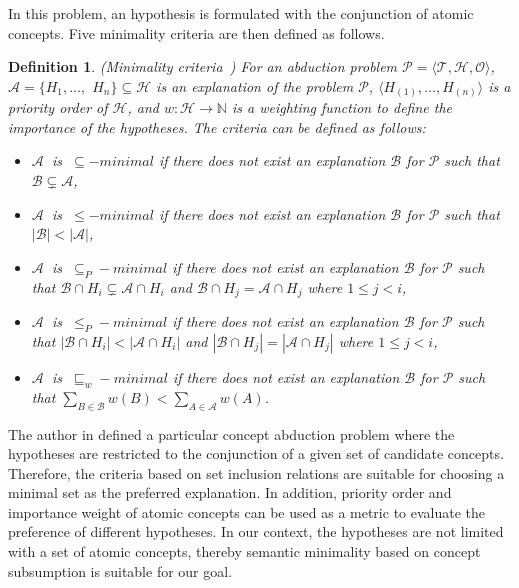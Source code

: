 \documentclass{article}
\newtheorem{mydef}{Definition}
\newcommand\abs[1]{\left\lvert #1 \right\rvert}
\begin{document}
In this problem, an hypothesis is formulated with the conjunction of atomic concepts.
Five minimality criteria are then defined as follows.
\begin{mydef}{(Minimality criteria~\cite{bienvenu08complexity})}
For an abduction problem $\mathcal{P}=\langle \mathcal{T},\mathcal{H}, \mathcal{O}\rangle$, $\mathcal{A}=\{H_1,\dots,$ $H_n \} \subseteq \mathcal{H}$ is an explanation of the problem $\mathcal{P}$,
$\langle H_{(1)},\dots,H_{(n)}\rangle$ is a priority order of  $\mathcal{H}$,
and $w:\mathcal{H}\rightarrow \mathbb{N}$ is a weighting function to define the importance of the hypotheses. The criteria can be defined as follows:
\begin{itemize}
\item  $\mathcal{A}~$ is  $~\subseteq -minimal$ if there does not exist an explanation $\mathcal{B}$ for $\mathcal{P}$ such that $\mathcal{B} \subsetneq \mathcal{A}$,
\item  $\mathcal{A}~$ is  $~\leq -minimal$ if there does not exist an explanation $\mathcal{B}$ for $\mathcal{P}$ such that $\abs{\mathcal{B}} < \abs{\mathcal{A}}$,
\item  $\mathcal{A}~$ is  $~\subseteq_P -minimal$ if there does not exist an explanation $\mathcal{B}$ for $\mathcal{P}$ such that $\mathcal{B} \cap H_i \subsetneq \mathcal{A}\cap H_i$ and
$\mathcal{B} \cap H_j = \mathcal{A}\cap H_j$ where $1\leq j< i$,
\item  $\mathcal{A}~$ is  $~\leq_P -minimal$ if there does not exist an explanation $\mathcal{B}$ for $\mathcal{P}$ such that $\abs{\mathcal{B} \cap H_i} < \abs{\mathcal{A}\cap H_i}$ and
$\abs{\mathcal{B} \cap H_j} = \abs{\mathcal{A}\cap H_j}$ where $1\leq j< i$,
\item  $\mathcal{A}~$ is  $~\sqsubseteq_w -minimal$ if there does not exist an explanation $\mathcal{B}$ for $\mathcal{P}$ such that $\sum_{B \in \mathcal{B}}w(B) < \sum_{A \in \mathcal{A}}w(A)$.
\end{itemize}
\label{def:minimality}
 \end{mydef}
 The author in \cite{bienvenu08complexity} defined a particular concept abduction problem where the hypotheses are restricted to the conjunction of a given set of candidate concepts.
 Therefore, the criteria based on set inclusion relations are suitable for choosing a minimal set as the preferred explanation. 
 In addition, priority order and importance weight of atomic concepts can be used as a metric to evaluate the preference of different hypotheses.
 In our context, the hypotheses are not limited with a set of atomic concepts, thereby semantic minimality based on concept subsumption is suitable for our goal.
\end{document}
